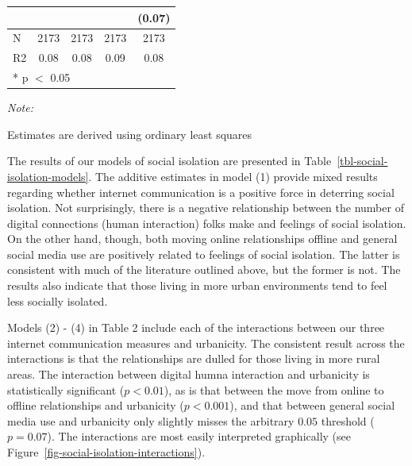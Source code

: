 \documentclass[
  letterpaper,
  DIV=11,
  numbers=noendperiod]{scrartcl}
\begin{document}
\begin{table}
{\begin{threeparttable}
\begin{tabular}[t]{lcccc}
 &  &  &  & (\num{0.07})\\
\midrule
N & \num{2173} & \num{2173} & \num{2173} & \num{2173}\\
R2 & \num{0.08} & \num{0.08} & \num{0.09} & \num{0.08}\\
\bottomrule
\multicolumn{5}{l}{\rule{0pt}{1em}* p $<$ 0.05}\\
\end{tabular}
\begin{tablenotes}
\item \textit{Note: } 
\item Estimates are derived using ordinary least squares
\end{tablenotes}
\end{threeparttable}

}

\end{table}%

The results of our models of social isolation are presented in
Table~\ref{tbl-social-isolation-models}. The additive estimates in model
(1) provide mixed results regarding whether internet communication is a
positive force in deterring social isolation. Not surprisingly, there is
a negative relationship between the number of digital connections (human
interaction) folks make and feelings of social isolation. On the other
hand, though, both moving online relationships offline and general
social media use are positively related to feelings of social isolation.
The latter is consistent with much of the literature outlined above, but
the former is not. The results also indicate that those living in more
urban environments tend to feel less socially isolated.

Models (2) - (4) in Table 2 include each of the interactions between our
three internet communication measures and urbanicity. The consistent
result across the interactions is that the relationships are dulled for
those living in more rural areas. The interaction between digital humna
interaction and urbanicity is statistically significant (\(p < 0.01\)),
as is that between the move from online to offline relationships and
urbanicity (\(p < 0.001\)), and that between general social media use
and urbanicity only slightly misses the arbitrary \(0.05\) threshold
(\(p = 0.07\)). The interactions are most easily interpreted graphically
(see Figure~\ref{fig-social-isolation-interactions}).
\end{document}
